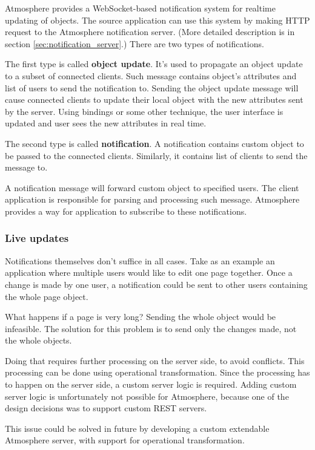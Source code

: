 Atmosphere provides a WebSocket-based notification system for realtime updating of objects. The source application can use this system by making HTTP request to the Atmosphere notification server. (More detailed description is in section \ref{sec:notification_server}.) There are two types of notifications.

The first type is called \textbf{object update}. It's used to propagate an object update to a subset of connected clients. Such message contains object's attributes and list of users to send the notification to. Sending the object update message will cause connected clients to update their local object with the new attributes sent by the server. Using bindings or some other technique, the user interface is updated and user sees the new attributes in real time.

The second type is called \textbf{notification}. A notification contains custom object to be passed to the connected clients. Similarly, it contains list of clients to send the message to. 

A notification message will forward custom object to specified users. The client application is responsible for parsing and processing such message. Atmosphere provides a way for application to subscribe to these notifications.

\subsubsection{Live updates}

Notifications themselves don't suffice in all cases. Take as an example an application where multiple users would like to edit one page together. Once a change is made by one user, a notification could be sent to other users containing the whole page object.

What happens if a page is very long? Sending the whole object would be infeasible. The solution for this problem is to send only the changes made, not the whole objects.

Doing that requires further processing on the server side, to avoid conflicts. This processing can be done using operational transformation. \citep{ot} Since the processing has to happen on the server side, a custom server logic is required. Adding custom server logic is unfortunately not possible for Atmosphere, because one of the design decisions was to support custom REST servers.

This issue could be solved in future by developing a custom extendable Atmosphere server, with support for operational transformation.

